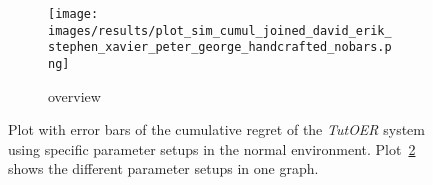 \begin{figure}[ht]
\begin{subfigure}{0.48\linewidth}
	\label{fig:cumul_handcrafted_peter}
	\end{subfigure}
	\begin{subfigure}{\linewidth}
	\texttt{[image: images/results/plot\_sim\_cumul\_joined\_david\_erik\_stephen\_xavier\_peter\_george\_handcrafted\_nobars.png]}
	\caption{overview}
	\label{fig:cumul_handcrafted_overview_group1}
	\end{subfigure}
	\caption{Plot with error bars of the cumulative regret of the \emph{TutOER}
	system using specific parameter setups in the normal environment.
	Plot~\ref{fig:cumul_handcrafted_overview_group1} shows the
	different parameter setups in one graph.}
	\label{fig:cumul_handcrafted_container_group1}
\end{figure}


